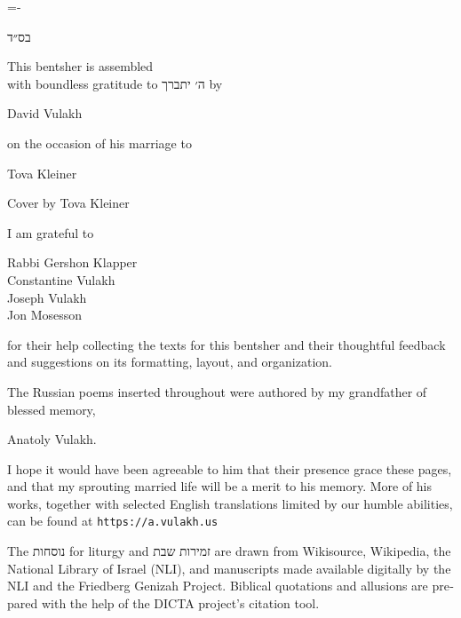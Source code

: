 \documentclass[11pt,twoside]{article}
\begin{document}
\thispagestyle{empty}
{\prose%
\setlength{\parskip}{2pt}%
\lineskiplimit=-\maxdimen%
\begin{english}
\scriptsize%
{\centering%
\vfill%
\texthebrew{\prose בס״ד}\par
}
\setlength{\leftskip}{0pt plus 0.5fil}%
\setlength{\rightskip}{0pt plus -0.5fil}%
\vspace{\baselineskip}%
This bentsher is assembled\\
with boundless gratitude to \texthebrew{\prose ה׳ יתברך} by\par
{\normalsize%
David Vulakh\par%
}
on the occasion of his marriage to\par%
{\normalsize%
Tova Kleiner\par%
}
\vspace{1\baselineskip}%
Cover by Tova Kleiner\par
\vspace{1\baselineskip}%
{\tiny I am grateful to\par}
Rabbi Gershon Klapper\\
Constantine Vulakh\\
Joseph Vulakh\\
Jon Mosesson\par
{\tiny%
for their help collecting the texts for this bentsher
and their thoughtful feedback and suggestions on its formatting,
layout, and organization.\par
}
\vspace{\baselineskip}%
{\tiny%
The Russian poems inserted throughout were authored by my grandfather
of blessed memory,\par}
{\centering%
Anatoly Vulakh.\par}
{\tiny%
\setlength{\leftskip}{0pt plus 0.5fil}%
\setlength{\rightskip}{0pt plus -0.5fil}%
I hope it would have been agreeable to him that their presence
grace these pages, and that my sprouting married life will be a
merit to his memory. More of his works, together with selected English
translations limited by our humble abilities, can be found at
{\englishprose\texttt{https://a.vulakh.us}}\par
}
\vspace{\baselineskip}%
{\fontsize{5.5}{6.7}%
\selectfont%
The \texthebrew{\prose נוסחות} for liturgy and
\texthebrew{\prose זמירות שבת} are drawn from
Wikisource, Wikipedia, the National Library of Israel (NLI),
and manuscripts made available digitally by the NLI and
the Friedberg Genizah Project.
Biblical quotations and allusions
are prepared with the help of the DICTA project’s citation tool.

}
\end{english}}
\end{document}
